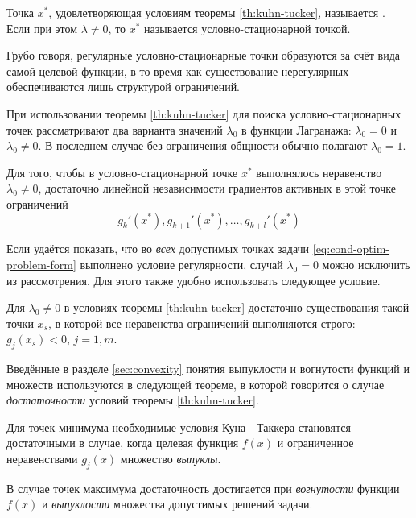 \begin{dfn}
  Точка $x^*$, удовлетворяющая условиям теоремы \ref{th:kuhn-tucker},
  называется . Если при этом $\lambda ≠
  0$, то $x^*$ называется  условно-стационарной
  точкой.
\end{dfn}

Грубо говоря, регулярные условно-стационарные точки образуются за счёт
вида самой целевой функции, в то время как существование нерегулярных
обеспечиваются лишь структурой ограничений.

При использовании теоремы \ref{th:kuhn-tucker} для поиска
условно-стационарных точек рассматривают два варианта значений
$\lambda_0$ в функции Лагранажа: $\lambda_0=0$ и $\lambda_0 \neq 0$. В
последнем случае без ограничения общности обычно полагают $\lambda_0 =
1$.

\begin{thm}
  \label{th:regular}
  Для того, чтобы в условно-стационарной точке $x^*$ выполнялось
  неравенство $\lambda_0 \neq 0$, достаточно линейной независимости
  градиентов активных в этой точке ограничений
  \begin{equation*}
    g_k'(x^*), g_{k+1}'(x^*), \dotsc, g_{k+l}'(x^*)
  \end{equation*}
\end{thm}

Если удаётся показать, что во \emph{всех} допустимых точках задачи
\eqref{eq:cond-optim-problem-form} выполнено условие регулярности,
случай $\lambda_0=0$ можно исключить из рассмотрения. Для этого также
удобно использовать следующее условие.

\begin{thm}
  \label{th:slater}
  Для $\lambda_0 \neq 0$ в условиях теоремы \ref{th:kuhn-tucker}
  достаточно существования такой точки $x_s$, в которой все
  неравенства ограничений выполняются строго: $g_j(x_s)<0, \,
  j=\overline{1,m}$.
\end{thm}

Введённые в разделе \ref{sec:convexity} понятия выпуклости и
вогнутости функций и множеств используются в следующей теореме, в
которой говорится о случае \emph{достаточности} условий теоремы
\ref{th:kuhn-tucker}.

\begin{thm}
  \label{th:kt-cond}
  Для точек минимума необходимые условия Куна—Таккера становятся
  достаточными в случае, когда целевая функция $f(x)$ и ограниченное
  неравенствами $g_j(x)$ множество \emph{выпуклы}.

  В случае точек максимума достаточность достигается при
  \emph{вогнутости} функции $f(x)$ и \emph{выпуклости} множества
  допустимых решений задачи.
\end{thm}

